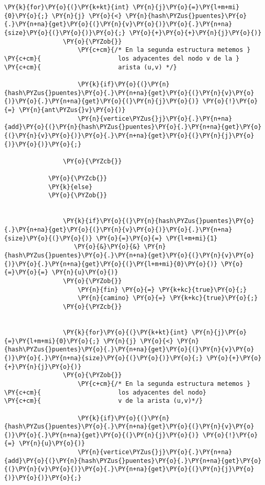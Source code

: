 \begin{Verbatim}[commandchars=\\\{\}]
			    \PY{k}{for}\PY{o}{(}\PY{k+kt}{int} \PY{n}{j}\PY{o}{=}\PY{l+m+mi}{0}\PY{o}{;} \PY{n}{j} \PY{o}{<} \PY{n}{hash\PYZus{}puentes}\PY{o}{.}\PY{n+na}{get}\PY{o}{(}\PY{n}{v}\PY{o}{)}\PY{o}{.}\PY{n+na}{size}\PY{o}{(}\PY{o}{)}\PY{o}{;} \PY{o}{+}\PY{o}{+}\PY{n}{j}\PY{o}{)}
				\PY{o}{\PYZob{}}
				    \PY{c+cm}{/* En la segunda estructura metemos }
\PY{c+cm}{				       los adyacentes del nodo v de la }
\PY{c+cm}{				       arista (u,v) */}
		
				    \PY{k}{if}\PY{o}{(}\PY{n}{hash\PYZus{}puentes}\PY{o}{.}\PY{n+na}{get}\PY{o}{(}\PY{n}{v}\PY{o}{)}\PY{o}{.}\PY{n+na}{get}\PY{o}{(}\PY{n}{j}\PY{o}{)} \PY{o}{!}\PY{o}{=} \PY{n}{ant\PYZus{}v}\PY{o}{)}			    
					\PY{n}{vertice\PYZus{}j}\PY{o}{.}\PY{n+na}{add}\PY{o}{(}\PY{n}{hash\PYZus{}puentes}\PY{o}{.}\PY{n+na}{get}\PY{o}{(}\PY{n}{v}\PY{o}{)}\PY{o}{.}\PY{n+na}{get}\PY{o}{(}\PY{n}{j}\PY{o}{)}\PY{o}{)}\PY{o}{;}
					
				\PY{o}{\PYZcb{}}
				
			\PY{o}{\PYZcb{}}
		    \PY{k}{else}
			\PY{o}{\PYZob{}}


			    \PY{k}{if}\PY{o}{(}\PY{n}{hash\PYZus{}puentes}\PY{o}{.}\PY{n+na}{get}\PY{o}{(}\PY{n}{v}\PY{o}{)}\PY{o}{.}\PY{n+na}{size}\PY{o}{(}\PY{o}{)} \PY{o}{=}\PY{o}{=} \PY{l+m+mi}{1} 
			       \PY{o}{&}\PY{o}{&} \PY{n}{hash\PYZus{}puentes}\PY{o}{.}\PY{n+na}{get}\PY{o}{(}\PY{n}{v}\PY{o}{)}\PY{o}{.}\PY{n+na}{get}\PY{o}{(}\PY{l+m+mi}{0}\PY{o}{)} \PY{o}{=}\PY{o}{=} \PY{n}{u}\PY{o}{)}
				\PY{o}{\PYZob{}}
				    \PY{n}{fin} \PY{o}{=} \PY{k+kc}{true}\PY{o}{;}
				    \PY{n}{camino} \PY{o}{=} \PY{k+kc}{true}\PY{o}{;}
				\PY{o}{\PYZcb{}}

				    
			    \PY{k}{for}\PY{o}{(}\PY{k+kt}{int} \PY{n}{j}\PY{o}{=}\PY{l+m+mi}{0}\PY{o}{;} \PY{n}{j} \PY{o}{<} \PY{n}{hash\PYZus{}puentes}\PY{o}{.}\PY{n+na}{get}\PY{o}{(}\PY{n}{v}\PY{o}{)}\PY{o}{.}\PY{n+na}{size}\PY{o}{(}\PY{o}{)}\PY{o}{;} \PY{o}{+}\PY{o}{+}\PY{n}{j}\PY{o}{)}
				\PY{o}{\PYZob{}}
				    \PY{c+cm}{/* En la segunda estructura metemos }
\PY{c+cm}{				       los adyacentes del nodo}
\PY{c+cm}{				       v de la arista (u,v)*/}
					
				    \PY{k}{if}\PY{o}{(}\PY{n}{hash\PYZus{}puentes}\PY{o}{.}\PY{n+na}{get}\PY{o}{(}\PY{n}{v}\PY{o}{)}\PY{o}{.}\PY{n+na}{get}\PY{o}{(}\PY{n}{j}\PY{o}{)} \PY{o}{!}\PY{o}{=} \PY{n}{u}\PY{o}{)}			    
					\PY{n}{vertice\PYZus{}j}\PY{o}{.}\PY{n+na}{add}\PY{o}{(}\PY{n}{hash\PYZus{}puentes}\PY{o}{.}\PY{n+na}{get}\PY{o}{(}\PY{n}{v}\PY{o}{)}\PY{o}{.}\PY{n+na}{get}\PY{o}{(}\PY{n}{j}\PY{o}{)}\PY{o}{)}\PY{o}{;}
					

\end{Verbatim}
